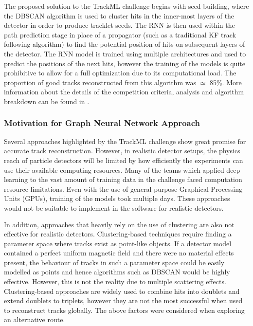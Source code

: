 The proposed solution to the TrackML challenge begins with seed building, where the DBSCAN algorithm is used to cluster hits in the inner-most layers of the detector in order to produce tracklet seeds. The RNN is then used within the path prediction stage in place of a propagator (such as a traditional KF track following algorithm) to find the potential position of hits on subsequent layers of the detector. The RNN model is trained using multiple architectures and used to predict the positions of the next hits, however the training of the models is quite prohibitive to allow for a full optimization due to its computational load. The proportion of good tracks reconstructed from this algorithm was $\simeq$ 85\%. More information about the details of the competition criteria, analysis and algorithm breakdown can be found in \cite{Amrouche_2019}.


\subsubsection{Motivation for Graph Neural Network Approach}
Several approaches highlighted by the TrackML challenge show great promise for accurate track reconstruction. However, in realistic detector setups, the physics reach of particle detectors will be limited by how efficiently the experiments can use their available computing resources. Many of the teams which applied deep learning to the vast amount of training data in the challenge faced computation resource limitations. Even with the use of general purpose Graphical Processing Units (GPUs), training of the models took multiple days. These approaches would not be suitable to implement in the software for realistic detectors.

In addition, approaches that heavily rely on the use of clustering are also not effective for realistic detectors. Clustering-based techniques require finding a parameter space where tracks exist as point-like objects. If a detector model contained a perfect uniform magnetic field and there were no material effects present, the behaviour of tracks in such a parameter space could be easily modelled as points and hence algorithms such as DBSCAN would be highly effective. However, this is not the reality due to multiple scattering effects. Clustering-based approaches are widely used to combine hits into doublets and extend doublets to triplets, however they are not the most successful when used to reconstruct tracks globally. The above factors were considered when exploring an alternative route. 


